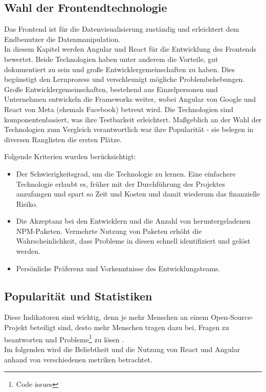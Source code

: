 \subsection{Wahl der Frontendtechnologie}
  Das Frontend ist für die Datenvisualisierung zuständig und erleichtert dem Endbenutzer die Datenmanipulation.\\
  In diesem Kapitel werden Angular und React für die Entwicklung des Frontends bewertet. Beide Technologien haben unter anderem die Vorteile, gut dokumentiert zu sein und große Entwicklergemeinschaften zu haben. Dies begünstigt den Lernprozess und verschleunigt mögliche Problembehebungen. Große Entwicklergemeinschaften, bestehend aus Einzelpersonen und Unternehmen entwickeln die Frameworks weiter, wobei Angular von Google und React von Meta (ehemals Facebook) betreut wird. Die Technologien sind komponentenbasiert, was ihre Testbarkeit erleichtert. Maßgeblich an der Wahl der Technologien zum Vergleich verantwortlich war ihre Popularität - sie belegen in diversen Ranglisten die ersten Plätze.\cite{SO01}

  Folgende Kriterien wurden berücksichtigt:
  \begin{itemize}
    \item
          Der Schwierigkeitsgrad, um die Technologie zu lernen. Eine einfachere Technologie erlaubt es, früher mit der Durchführung des Projektes anzufangen und spart so Zeit und Kosten und damit wiederum das finanzielle Risiko.
    \item
          Die Akzeptanz bei den Entwicklern und die Anzahl von heruntergeladenen NPM-Paketen. Vermehrte Nutzung von Paketen erhöht die Wahrscheinlichkeit, dass Probleme in diesen schnell identifiziert und gelöst werden.\cite{LIN1}
    \item
          Persönliche Präferenz und Vorkenntnisse des Entwicklungsteams.

  \end{itemize}

\subsection{Popularität und Statistiken}
Diese Indikatoren sind wichtig, denn je mehr Menschen an einem Open-Source-Projekt beteiligt sind, desto mehr Menschen tragen dazu bei, Fragen zu beantworten und Probleme\footnote{Code issues} zu lösen {\cite{LIN1}}.
\\
Im folgenden wird die Beliebtheit und die Nutzung von React und Angular anhand von verschiedenen metriken betrachtet.

